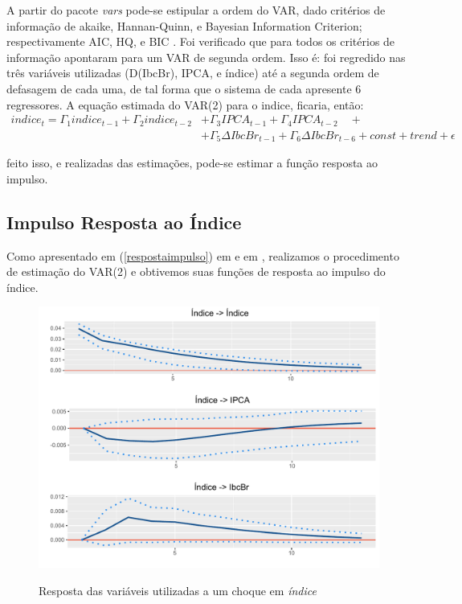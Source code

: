 A partir do pacote \textit{vars} pode-se estipular a ordem do VAR, dado critérios de informação de akaike, Hannan-Quinn, e Bayesian Information Criterion; respectivamente AIC, HQ, e BIC \cite{pfaff2008var}. Foi verificado que para todos os critérios de informação apontaram para um VAR de segunda ordem. Isso é: foi regredido nas três variáveis utilizadas (D(IbcBr), IPCA, e índice) até a segunda ordem de defasagem de cada uma, de tal forma que o sistema de cada apresente 6 regressores. A equação estimada do VAR(2) para o indice, ficaria, então:
\begin{align*}
    indice_t = \Gamma_1 indice_{t-1} + \Gamma_2 indice_{t-2} &+ \Gamma_3 IPCA_{t-1} + \Gamma_4 IPCA_{t-2}\quad+ \\
                                                           & + \Gamma_5 \Delta IbcBr_{t-1} + \Gamma_6 \Delta IbcBr_{t-6} + const + trend + \epsilon
\end{align*}

\noindent
feito isso, e realizadas das estimações, pode-se estimar a função resposta ao impulso.

\subsection{Impulso Resposta ao Índice}
Como apresentado em (\ref{respostaimpulso}) em  e em , realizamos o procedimento de estimação do VAR(2) e obtivemos suas funções de resposta ao impulso do índice.

\begin{figure}[!h]
    \centering
    \caption{Resposta das variáveis utilizadas a um choque em \textit{índice}}
    \includegraphics[width=.8\textwidth]{capitulos/figures/irf.pdf}
    \label{fig:fri}
\end{figure}

